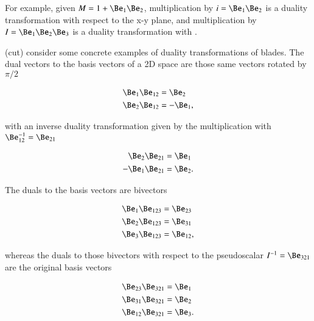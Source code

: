 %
%


For example, given \( M = 1 + \Be_1 \Be_2 \), multiplication by \( i = \Be_1 \Be_2 \) is a duality transformation with respect to the x-y plane, and multiplication by \( I = \Be_1 \Be_2 \Be_3 \) is a duality transformation with .

(cut)
consider some concrete examples of duality transformations of blades.
The dual vectors to the basis vectors of a 2D space are those same vectors rotated by \( \pi/2 \)

\begin{dmath}\label{eqn:definitions:360}
\begin{aligned}
\Be_1 \Be_{12} &= \Be_2 \\
\Be_2 \Be_{12} &= -\Be_1,
\end{aligned}
\end{dmath}

with an inverse duality transformation given by the multiplication with \( \Be_{12}^{-1} = \Be_{21} \)

\begin{dmath}\label{eqn:definitions:440}
\begin{aligned}
\Be_2 \Be_{21} &= \Be_1 \\
-\Be_1 \Be_{21} &= \Be_2.
\end{aligned}
\end{dmath}

The  duals to the basis vectors are bivectors

\begin{dmath}\label{eqn:definitions:380}
\begin{aligned}
\Be_1 \Be_{123} &= \Be_{23} \\
\Be_2 \Be_{123} &= \Be_{31} \\
\Be_3 \Be_{123} &= \Be_{12},
\end{aligned}
\end{dmath}

whereas the duals to those bivectors with respect to the pseudoscalar \( I^{-1} = \Be_{321} \) are the original basis vectors

\begin{dmath}\label{eqn:definitions:400}
\begin{aligned}
\Be_{23} \Be_{321} &= \Be_1 \\
\Be_{31} \Be_{321} &= \Be_2 \\
\Be_{12} \Be_{321} &= \Be_3.
\end{aligned}
\end{dmath}

